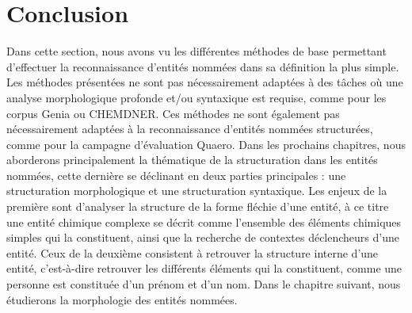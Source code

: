 \documentclass[12pt,a4paper,times,twoside,openright]{report}
\begin{document}
    \section{Conclusion}
    \label{sec:overview-conclusion}
Dans cette section, nous avons vu les différentes méthodes de base permettant d'effectuer la reconnaissance d'entités nommées dans sa définition la plus simple. Les méthodes présentées ne sont pas nécessairement adaptées à des tâches où une analyse morphologique profonde et/ou syntaxique est requise, comme pour les corpus Genia ou CHEMDNER. Ces méthodes ne sont également pas nécessairement adaptées à la reconnaissance d'entités nommées structurées, comme pour la campagne d'évaluation Quaero. Dans les prochains chapitres, nous aborderons principalement la thématique de la structuration dans les entités nommées, cette dernière se déclinant en deux parties principales : une structuration morphologique et une structuration syntaxique. Les enjeux de la première sont d'analyser la structure de la forme fléchie d'une entité, à ce titre une entité chimique complexe se décrit comme l'ensemble des éléments chimiques simples qui la constituent, ainsi que la recherche de contextes déclencheurs d'une entité. Ceux de la deuxième consistent à retrouver la structure interne d'une entité, c'est-à-dire retrouver les différents éléments qui la constituent, comme une personne est constituée d'un prénom et d'un nom. Dans le chapitre suivant, nous étudierons la morphologie des entités nommées.
\end{document}
